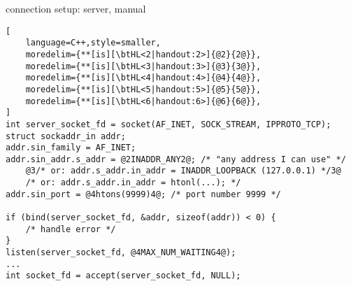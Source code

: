 \begin{frame}[fragile,label=connSetupServer]{connection setup: server, manual}
\begin{lstlisting}[
    language=C++,style=smaller,
    moredelim={**[is][\btHL<2|handout:2>]{@2}{2@}},
    moredelim={**[is][\btHL<3|handout:3>]{@3}{3@}},
    moredelim={**[is][\btHL<4|handout:4>]{@4}{4@}},
    moredelim={**[is][\btHL<5|handout:5>]{@5}{5@}},
    moredelim={**[is][\btHL<6|handout:6>]{@6}{6@}},
]
int server_socket_fd = socket(AF_INET, SOCK_STREAM, IPPROTO_TCP);
struct sockaddr_in addr;
addr.sin_family = AF_INET;
addr.sin_addr.s_addr = @2INADDR_ANY2@; /* "any address I can use" */
    @3/* or: addr.s_addr.in_addr = INADDR_LOOPBACK (127.0.0.1) */3@
    /* or: addr.s_addr.in_addr = htonl(...); */
addr.sin_port = @4htons(9999)4@; /* port number 9999 */

if (bind(server_socket_fd, &addr, sizeof(addr)) < 0) {
    /* handle error */
}
listen(server_socket_fd, @4MAX_NUM_WAITING4@);
...
int socket_fd = accept(server_socket_fd, NULL);
\end{lstlisting}
\end{frame}
